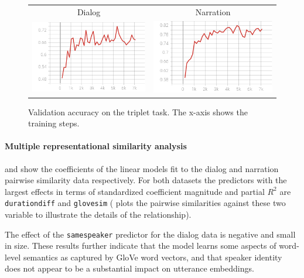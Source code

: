 \begin{figure}
  \centering
  \begin{tabular}{cc}
    Dialog & Narration \\
    \includegraphics[scale=0.3]{val_acc3.png}  & \includegraphics[scale=0.3]{valnarr_acc3.png}\\
  \end{tabular}
  \caption{Validation accuracy on the triplet task. The x-axis shows
    the training steps.}
  \label{fig:triplet}
\end{figure}

\paragraph{Multiple representational similarity analysis}
 and  show the coefficients
of the linear models fit to the dialog and narration pairwise
similarity data respectively. For both datasets the predictors with
the largest effects in terms of standardized coefficient magnitude and
partial $R^2$ are {\tt durationdiff} and {\tt glovesim}
( plots the pairwise similarities
against these two variable to illustrate the details of the
relationship).
 
The effect of
the {\tt samespeaker} predictor for the dialog data is negative and
small in size.  These results further indicate that the model learns
some aspects of word-level semantics as captured by GloVe word
vectors, and that speaker identity does not appear to be a substantial
impact on utterance embeddings.

